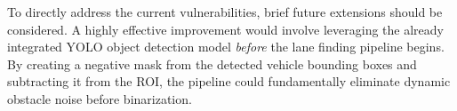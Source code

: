 \documentclass[12pt,a4paper]{article}
\begin{document}
To directly address the current vulnerabilities, brief future extensions should be considered. A highly effective improvement would involve leveraging the already integrated YOLO object detection model \textit{before} the lane finding pipeline begins. By creating a negative mask from the detected vehicle bounding boxes and subtracting it from the ROI, the pipeline could fundamentally eliminate dynamic obstacle noise before binarization.
\end{document}

